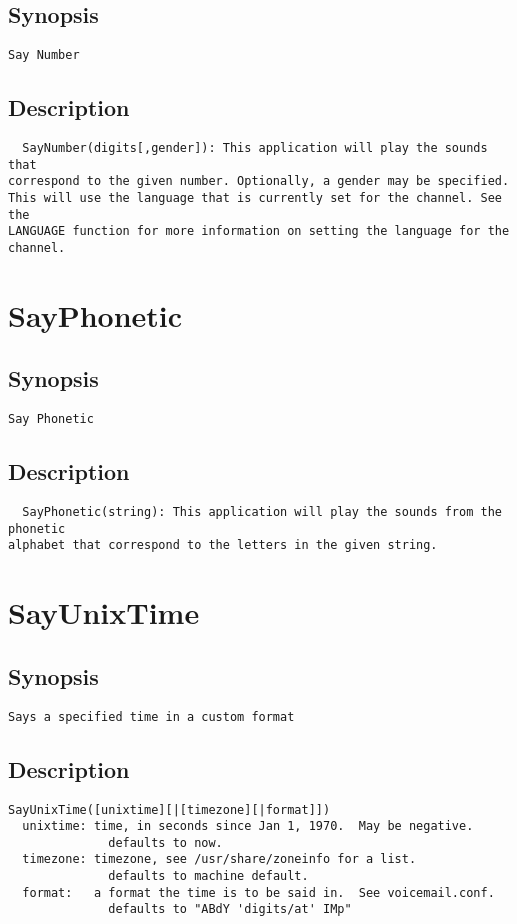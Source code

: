 \subsection{Synopsis}
\begin{verbatim}
Say Number
\end{verbatim}
\subsection{Description}
\begin{verbatim}
  SayNumber(digits[,gender]): This application will play the sounds that
correspond to the given number. Optionally, a gender may be specified.
This will use the language that is currently set for the channel. See the
LANGUAGE function for more information on setting the language for the channel.

\end{verbatim}


\section{SayPhonetic}
\subsection{Synopsis}
\begin{verbatim}
Say Phonetic
\end{verbatim}
\subsection{Description}
\begin{verbatim}
  SayPhonetic(string): This application will play the sounds from the phonetic
alphabet that correspond to the letters in the given string.

\end{verbatim}


\section{SayUnixTime}
\subsection{Synopsis}
\begin{verbatim}
Says a specified time in a custom format
\end{verbatim}
\subsection{Description}
\begin{verbatim}
SayUnixTime([unixtime][|[timezone][|format]])
  unixtime: time, in seconds since Jan 1, 1970.  May be negative.
              defaults to now.
  timezone: timezone, see /usr/share/zoneinfo for a list.
              defaults to machine default.
  format:   a format the time is to be said in.  See voicemail.conf.
              defaults to "ABdY 'digits/at' IMp"

\end{verbatim}


